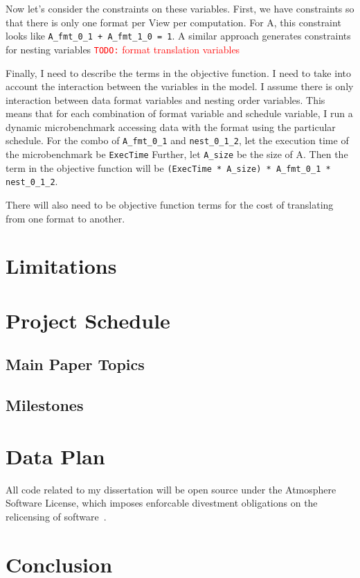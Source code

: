 \documentclass{article}
\newcommand{\todo}[1]{{\textcolor{red}{{\tt{TODO:}}\,\,#1 }}}
\begin{document}
Now let's consider the constraints on these variables. 
First, we have constraints so that there is only one format per View per computation. For A, this constraint looks like \verb.A_fmt_0_1 + A_fmt_1_0 = 1..
A similar approach generates constraints for nesting variables
\todo{format translation variables}

Finally, I need to describe the terms in the objective function.
I need to take into account the interaction between the variables in the model.
I assume there is only interaction between data format variables and nesting order variables. 
This means that for each combination of format variable and schedule variable, I run a dynamic microbenchmark accessing data with the format using the particular schedule. 
For the combo of \verb.A_fmt_0_1. and \verb.nest_0_1_2., let the execution time of the microbenchmark be \verb.ExecTime.
Further, let \verb.A_size. be the size of A. 
Then the term in the objective function will be \verb.(ExecTime * A_size) * A_fmt_0_1 * nest_0_1_2..

There will also need to be objective function terms for the cost of translating from one format to another. 

\section{Limitations}

\section{Project Schedule}

\subsection{Main Paper Topics}

\subsection{Milestones}



\section{Data Plan}

All code related to my dissertation will be open source under the Atmosphere Software License, which imposes enforcable divestment obligations on the relicensing of software~\cite{atmospherelicense}. 
\section{Conclusion}




\end{document}
